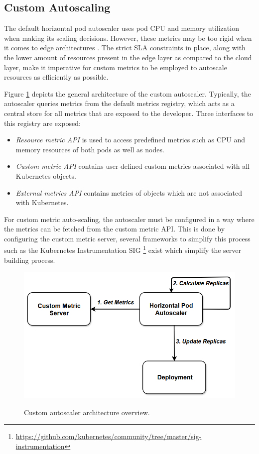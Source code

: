 \subsection{Custom Autoscaling}
\label{subsec:custom-auto-scaling}

The default horizontal pod autoscaler uses pod CPU and memory utilization when making its scaling decisions. However, these metrics may be too rigid when it comes to edge architectures \cite{coulson2020adaptive}. The strict SLA constraints in place, along with the lower amount of resources present in the edge layer as compared to the cloud layer, make it imperative for custom metrics to be employed to autoscale resources as efficiently as possible.\par

Figure \ref{fig:custom-autoscale-overview} depicts the general architecture of the custom autoscaler. Typically, the autoscaler queries metrics from the default metrics registry, which acts as a central store for all metrics that are exposed to the developer. Three interfaces to this registry are exposed:
\begin{itemize}
    \item \textit{Resource metric API} is used to access predefined metrics such as CPU and memory resources of both pods as well as nodes.
    \item \textit{Custom metric API} contains user-defined custom metrics associated with all Kubernetes objects.
    \item \textit{External metrics API} contains metrics of objects which are not associated with Kubernetes.
\end{itemize}
For custom metric auto-scaling, the autoscaler must be configured in a way where the metrics can be fetched from the custom metric API. This is done by configuring the custom metric server, several frameworks to simplify this process such as the Kubernetes Instrumentation SIG \footnote{\url{https://github.com/kubernetes/community/tree/master/sig-instrumentation}} exist which simplify the server building process.

\begin{figure}[htb]
    \centering
    \caption{Custom autoscaler architecture overview.}
    \includegraphics[width=.7\linewidth]{Figures/Custom-Metrics-Autoscaling.png}
    \label{fig:custom-autoscale-overview}
\end{figure}

